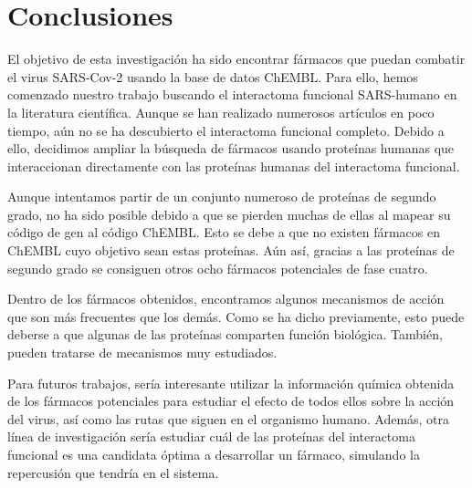 \section{Conclusiones}

El objetivo de esta investigación ha sido encontrar fármacos que puedan combatir el virus SARS-Cov-2 usando la base de datos ChEMBL. Para ello, hemos comenzado nuestro trabajo buscando el interactoma funcional SARS-humano en la literatura científica. Aunque se han realizado numerosos artículos en poco tiempo, aún no se ha descubierto el interactoma funcional completo. Debido a ello, decidimos ampliar la búsqueda de fármacos usando proteínas humanas que interaccionan directamente con las proteínas humanas del interactoma funcional.

Aunque intentamos partir de un conjunto numeroso de proteínas de segundo grado, no ha sido posible debido a que se pierden muchas de ellas al mapear su código de gen al código ChEMBL. Esto se debe a que no existen fármacos en ChEMBL cuyo objetivo sean estas proteínas. Aún así, gracias a las proteínas de segundo grado se consiguen otros ocho fármacos potenciales de fase cuatro. 

Dentro de los fármacos obtenidos, encontramos algunos mecanismos de acción que son más frecuentes que los demás. Como se ha dicho previamente, esto puede deberse a que algunas de las proteínas comparten función biológica. También, pueden tratarse de mecanismos muy estudiados. 

Para futuros trabajos, sería interesante utilizar la información química obtenida de los fármacos potenciales para estudiar el efecto de todos ellos sobre la acción del virus, así como las rutas que siguen en el organismo humano. Además, otra línea de investigación sería estudiar cuál de las proteínas del interactoma funcional es una candidata óptima a desarrollar un fármaco, simulando la repercusión que tendría en el sistema. 

\newpage
